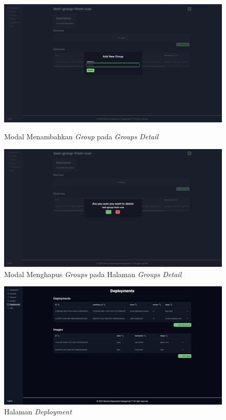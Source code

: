 \begin{figure}[ht]
  \centering
  \caption{Modal Menambahkan \textit{Group} pada \textit{Groups Detail}}
  \includegraphics[width=1\textwidth]{resources/chapter-4/dashboard/groups-detail-add-device.jpg}
  \label{fig:halaman-groups-detail-add-group}
\end{figure}

\begin{figure}[ht]
  \centering
  \includegraphics[width=1\textwidth]{resources/chapter-4/dashboard/groups-detail-delete.jpg}
  \caption{Modal Menghapus \textit{Groups} pada Halaman \textit{Groups Detail}}
  \label{fig:halaman-groups-detail-delete}
\end{figure}

\begin{figure}[ht]
  \centering
  \includegraphics[width=1\textwidth]{resources/chapter-4/dashboard/deployment-page.jpg}
  \caption{Halaman \textit{Deployment}}
  \label{fig:halaman-deployment}
\end{figure}

